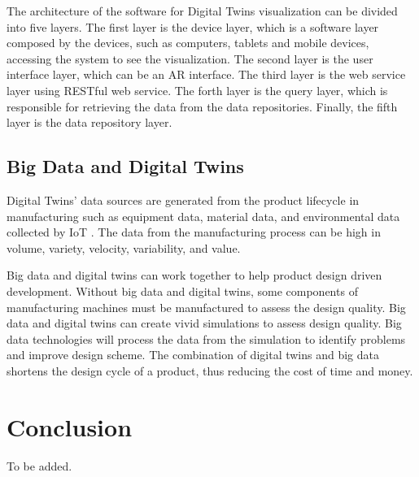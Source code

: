 \documentclass[article]{aaltoseries}
\begin{document}
The architecture of the software for Digital Twins visualization can be divided into five layers. The first layer is the device layer, which is a software layer composed by the devices, such as computers, tablets and mobile devices, accessing the system to see the visualization. The second layer is the user interface layer, which can be an AR interface. The third layer is the web service layer using RESTful web service. The forth layer is the query layer, which is responsible for retrieving the data from the data repositories. Finally, the fifth layer is the data repository layer.

\subsection{Big Data and Digital Twins}
Digital Twins' data sources are generated from the product lifecycle in manufacturing such as equipment data, material data, and environmental data collected by IoT \cite{TAO2019183}. The data from the manufacturing process can be high in volume, variety, velocity, variability, and value.

Big data and digital twins can work together to help product design driven development. Without big data and digital twins, some components of manufacturing machines must be manufactured to assess the design quality. Big data and digital twins can create vivid simulations to assess design quality. Big data technologies will process the data from the simulation to identify problems and improve design scheme. The combination of digital twins and big data shortens the design cycle of a product, thus reducing the cost of time and money.





\section{Conclusion}

To be added.






\end{document}
